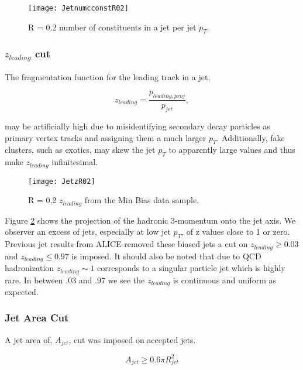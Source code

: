 \begin{figure}[h]
\texttt{[image: JetnumcconstR02]}
\centering
\caption{R = 0.2 number of constituents in a jet per jet $p_{T}$.}
\label{fig:JetConst}
\end{figure}



\noindent
\subsubsection{$z_{leading}$ cut}

The fragmentation function for the leading track in a jet,

\begin{equation}
z_{leading} = \frac{ p_{leading, proj} }{ p_{jet} },
\label{eq:zleading}
\end{equation}

\noindent
may be artificially high due to misidentifying secondary decay particles as primary vertex tracks and assigning them a much larger $p_{T}$.  Additionally, fake clusters, such as exotics, may skew the jet $p_{T}$ to apparently large values and thus make $z_{leading}$ infinitesimal.  

\begin{figure}[h]
\texttt{[image: JetzR02]}
\centering
\caption{R = 0.2 $z_{leading}$ from the Min Bias data sample.}
\label{fig:Jetz}
\end{figure}

\noindent
Figure \ref{fig:Jetz} shows the projection of the hadronic 3-momentum onto the jet axis.  We observer an excess of jets, especially at low jet $p_{T}$, of z values close to 1 or zero.  Previous jet results from ALICE removed these biased jets a cut on $ z_{leading} \geq 0.03$ and $z_{leading} \leq 0.97$ is imposed.  It should also be noted that due to QCD hadronization $z_{leading} \sim 1$ corresponds to a singular particle jet which is highly rare.  In between .03 and .97 we see the $z_{leading}$ is continuous and uniform as expected.  

\subsubsection{Jet Area Cut}

A jet area of, $A_{jet}$, cut was imposed on accepted jets.

\begin{equation}
A_{jet} \geq 0.6 \pi R_{jet}^{2}
\label{eq:AreaJet}
\end{equation}

